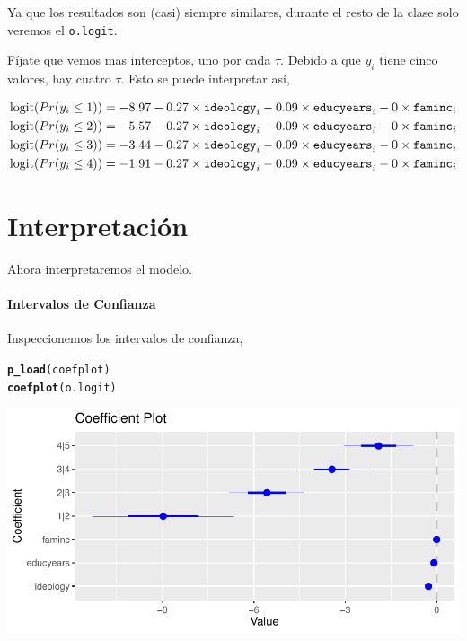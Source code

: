 \documentclass[onesided]{article}\usepackage[]{graphicx}\usepackage[]{color}
\makeatletter
\def\maxwidth{ %
  \ifdim\Gin@nat@width>\linewidth
    \linewidth
  \else
    \Gin@nat@width
  \fi
}
\newcommand{\hlstd}[1]{\textcolor[rgb]{0.345,0.345,0.345}{#1}}%
\newcommand{\hlkwd}[1]{\textcolor[rgb]{0.737,0.353,0.396}{\textbf{#1}}}%
\newenvironment{kframe}{%
 \def\at@end@of@kframe{}%
 \ifinner\ifhmode%
  \def\at@end@of@kframe{\end{minipage}}%
  \begin{minipage}{\columnwidth}%
 \fi\fi%
 \def\FrameCommand##1{\hskip\@totalleftmargin \hskip-\fboxsep
 \colorbox{shadecolor}{##1}\hskip-\fboxsep
     \hskip-\linewidth \hskip-\@totalleftmargin \hskip\columnwidth}%
 \MakeFramed {\advance\hsize-\width
   \@totalleftmargin\z@ \linewidth\hsize
   \@setminipage}}%
 {\par\unskip\endMakeFramed%
 \at@end@of@kframe}
\newenvironment{knitrout}{}{} %
\makeatother
\begin{document}
Ya que los resultados son (casi) siempre similares, durante el resto de la clase solo veremos el \texttt{o.logit}.

F\'ijate que vemos mas interceptos, uno por cada $\tau$. Debido a que $y_{i}$ tiene cinco valores, hay cuatro $\tau$. Esto se puede interpretar as\'i,

\begin{equation}\label{logit.inter}
\begin{split}
\text{logit}(Pr(y_{i}\leq1)) = -8.97 -0.27\times\text{\texttt{ideology}}_{i} -0.09\times\text{\texttt{educyears}}_{i} - 0\times\text{\texttt{faminc}}_{i} \\
\text{logit}(Pr(y_{i}\leq2)) = -5.57 -0.27\times\text{\texttt{ideology}}_{i} -0.09\times\text{\texttt{educyears}}_{i} - 0\times\text{\texttt{faminc}}_{i} \\
\text{logit}(Pr(y_{i}\leq3)) = -3.44 -0.27\times\text{\texttt{ideology}}_{i} -0.09\times\text{\texttt{educyears}}_{i} - 0\times\text{\texttt{faminc}}_{i} \\
\text{logit}(Pr(y_{i}\leq4)) = -1.91 -0.27\times\text{\texttt{ideology}}_{i} -0.09\times\text{\texttt{educyears}}_{i} - 0\times\text{\texttt{faminc}}_{i} 
\end{split}
\end{equation}

\section{Interpretaci\'on} 

Ahora interpretaremos el modelo. 

\paragraph{Intervalos de Confianza} Inspeccionemos los intervalos de confianza,

\begin{knitrout}
\color{fgcolor}\begin{kframe}
\begin{alltt}
\hlkwd{p_load}\hlstd{(coefplot)}
\hlkwd{coefplot}\hlstd{(o.logit)}
\end{alltt}
\end{kframe}

{\centering \includegraphics[width=\maxwidth]{figure/coefplot-1} 

}



\end{knitrout}
\end{document}
